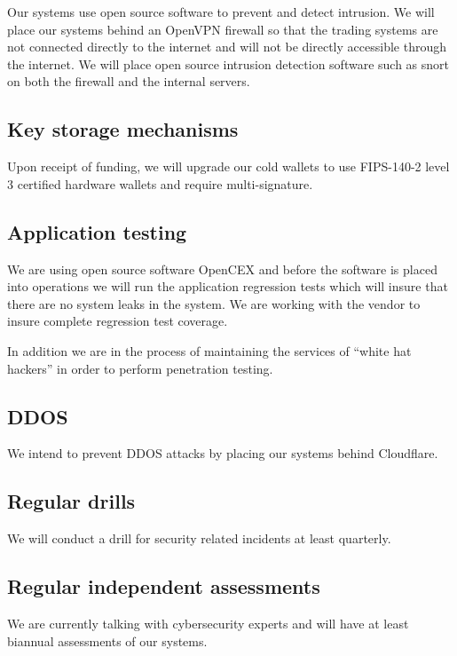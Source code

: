 Our systems use open source software to prevent and detect intrusion.
We will place our systems behind an OpenVPN firewall so that the
trading systems are not connected directly to the internet and will
not be directly accessible through the internet.  We will place open
source intrusion detection software such as snort on both the firewall
and the internal servers.

\subsection{Key storage mechanisms}
Upon receipt of funding, we will upgrade our cold wallets to use
FIPS-140-2 level 3 certified hardware wallets and require
multi-signature.


\subsection{Application testing}
We are using open source software OpenCEX and before the software is
placed into operations we will run the application regression tests
which will insure that there are no system leaks in the system.  We
are working with the vendor to insure complete regression test
coverage.

In addition we are in the process of maintaining the services of
``white hat hackers'' in order to perform penetration testing.

\subsection{DDOS}
We intend to prevent DDOS attacks by placing our systems behind
Cloudflare.

\subsection{Regular drills}
We will conduct a drill for security related incidents at least quarterly.


\subsection{Regular independent assessments}
We are currently talking with cybersecurity experts and will have at
least biannual assessments of our systems.


